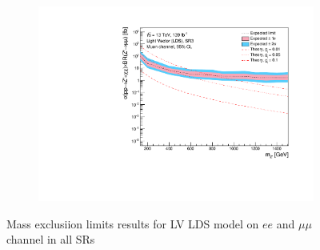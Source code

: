 \documentclass[12pt, a4paper]{book}
\begin{document}
\begin{figure}[!ht]
\begin{subfigure}[b]{0.49\textwidth}
   \end{subfigure}
   \hfill
   \begin{subfigure}[b]{0.49\textwidth}
      \centering
      \includegraphics[width=1\textwidth]{Limits/Model_independent/150/LV_LDS/mass_exclusion_uu.pdf}
   \end{subfigure}
   \caption{Mass exclusiion limits results for LV LDS model on $ee$ and $\mu\mu$ channel in all SRs}\label{fig:LV_LDS_me_SRS}
\end{figure}
\end{document}
